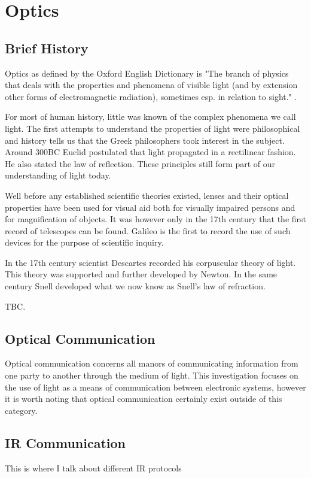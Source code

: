 
\section{Optics}

\subsection{Brief History}
Optics as defined by the Oxford English Dictionary is "The branch of physics that deals with the properties and phenomena of visible light (and by extension other forms of electromagnetic radiation), sometimes esp. in relation to sight." \cite{oed}.

For most of human history, little was known of the complex phenomena we call light. The first attempts to understand the properties of light were philosophical and history tells us that the Greek philosophers took interest in the subject. Around 300BC Euclid postulated that light propagated in a rectilinear fashion. He also stated the law of reflection. These principles still form part of our understanding of light today. \cite{Vohnsen_2004}

Well before any established scientific theories existed, lenses and their optical properties have been used for visual aid both for visually impaired persons and for magnification of objects. It was however only in the 17th century that the first record of telescopes can be found. Galileo is the first to record the use of such devices for the purpose of scientific inquiry.

In the 17th century scientist Descartes recorded his corpuscular theory of light. This theory was supported and further developed by Newton. In the same century Snell developed what we now know as Snell's law of refraction.

TBC.

\subsection{Optical Communication}

Optical communication concerns all manors of communicating information from one party to another through the medium of light. This investigation focuses on the use of light as a means of communication between electronic systems, however it is worth noting that optical communication certainly exist outside of this category. 


\subsection{IR Communication}
This is where I talk about different IR protocols

